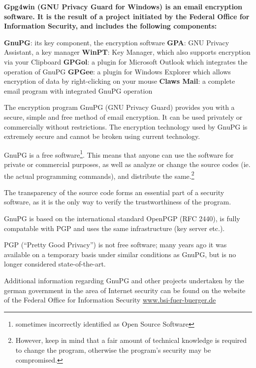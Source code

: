 

\textbf{
Gpg4win (GNU Privacy Guard for Windows) is an email encryption software.
It is the result of a project initiated by the Federal Office for
Information Security, and includes the following components: 
}

\textbf{GnuPG}: its key component, the encryption software \newline
\textbf{GPA}: GNU Privacy Assistant,
a key manager \newline
\textbf{WinPT}: Key Manager, which also supports encryption via your
Clipboard \newline
\textbf{GPGol}: a plugin for Microsoft Outlook which integrates the
operation of GnuPG \newline
\textbf{GPGee}: a plugin for Windows Explorer which allows encryption of
data by right-clicking on your mouse \newline
\textbf{Claws Mail}: a complete email program with integrated GnuPG
operation \newline

The encryption program GnuPG (GNU Privacy Guard) provides you with a
secure, simple and free method of email encryption. It can be used
privately or commercially without restrictions.  The encryption
technology used by GnuPG is extremely secure and cannot be broken using
current technology.

GnuPG is a free software\footnote{sometimes incorrectly identified as
Open Source Software}. This means that anyone can use the software for
private or commercial purposes, as well as analyze or change the source
codes (ie. the actual programming commands), and distribute the
same.\footnote{However, keep in mind that a fair amount of technical
knowledge is required to change the program, otherwise the program's
security may be compromised.}

The transparency of the source code forms an essential part of a
security software, as it is the only way to verify the trustworthiness
of the program.


GnuPG is based on the international standard OpenPGP (RFC 2440), is
fully compatable with PGP and uses the same infrastructure (key server
etc.).

PGP ("`Pretty Good Privacy"') is not free software; many years ago it
was available on a temporary basis under similar conditions as GnuPG,
but is no longer considered state-of-the-art.  

Additional information regarding GnuPG and other projects undertaken by
the german government in the area of Internet security can be found on
the website of the Federal Office for Information Security \W
{}
\T\href{http://www.bsi-fuer-buerger.de}{www.bsi-fuer-buerger.de}



